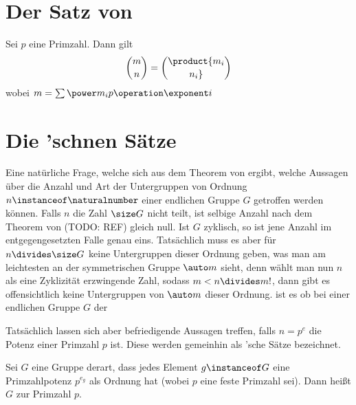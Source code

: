\section{Der Satz von }

\begin{theorem}
    Sei $p$ eine Primzahl. Dann gilt
    $$
    {m \choose n} = \product {{m_i} \choose {n_i}}
    $$
    wobei $m=\sum \power m_i p\operation\exponent i$
\end{theorem}

\section{Die 'schnen Sätze}

Eine natürliche Frage, welche sich aus dem Theorem von  ergibt, welche Aussagen über die Anzahl und Art der
Untergruppen von Ordnung $n\instanceof\naturalnumber$ einer endlichen Gruppe $G$ getroffen werden können.
Falls $n$ die Zahl $\size G$ nicht teilt, ist selbige Anzahl nach dem Theorem von  (TODO: REF) gleich null. Ist $G$ zyklisch, so
ist jene Anzahl im entgegengesetzten Falle genau eins. Tatsächlich muss es aber für $n\divides \size G$ keine Untergruppen dieser
Ordnung geben, was man am leichtesten an der symmetrischen Gruppe $\auto m$ sieht, denn wählt man nun $n$ als eine Zyklizität
erzwingende Zahl, sodass $m<n\divides m!$, dann gibt es offensichtlich keine Untergruppen von $\auto m$ dieser Ordnung.
ist es ob bei einer endlichen Gruppe $G$ der

Tatsächlich lassen sich aber befriedigende Aussagen treffen, falls $n=p^e$ die Potenz einer Primzahl $p$ ist. Diese werden
gemeinhin als 'sche Sätze bezeichnet.

\begin{definition}[Primärgruppe]
    Sei $G$ eine Gruppe derart, dass jedes Element $g\instanceof G$ eine Primzahlpotenz $p^{e_g}$ als Ordnung hat (wobei $p$ eine feste
    Primzahl sei). Dann heißt $G$  zur Primzahl $p$.
\end{definition}

